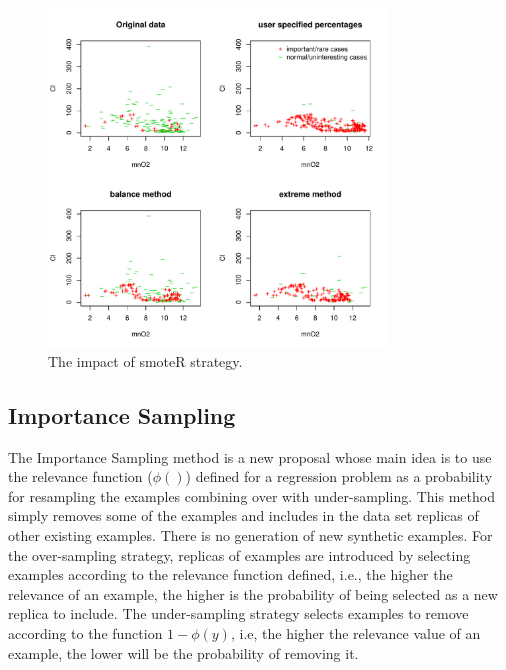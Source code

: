 \documentclass[10pt,a4paper]{article}\usepackage[]{graphicx}\usepackage[]{color}
\newenvironment{knitrout}{}{} %
\begin{document}
\begin{knitrout}\footnotesize
{}\color{fgcolor}\begin{figure}

{\centering \includegraphics[width=0.8\textwidth]{figures/UBL-smoteR_fig2-1} 

}

\caption[The impact of smoteR strategy]{The impact of smoteR strategy.}\label{fig:smoteR_fig2}
\end{figure}


\end{knitrout}



\subsection{Importance Sampling}\label{sec:ISRegress}

The Importance Sampling method is a new proposal whose main idea is to use the relevance function ($\phi()$) defined for a regression problem as a probability for resampling the examples combining over with under-sampling. This method simply removes some of the examples and includes in the data set replicas of other existing examples. There is no generation of new synthetic examples. For the over-sampling strategy, replicas of examples are introduced by selecting examples according to the relevance function defined, i.e., the higher the relevance of an example, the higher is the probability of being selected as a new replica to include. The under-sampling strategy selects examples to remove according to the function $1-\phi(y)$, i.e, the higher the relevance value of an example, the lower will be the probability of removing it.
\end{document}

